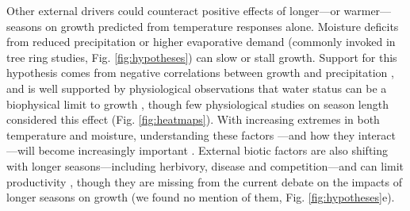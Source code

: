 \documentclass[11pt]{article}
\newcommand{\R}[1]{\label{#1}\linelabel{#1}}
\begin{document}
Other external drivers could counteract positive effects of longer---or warmer---seasons on growth predicted from temperature responses alone. Moisture deficits from reduced precipitation or higher evaporative demand (commonly invoked in tree ring studies, Fig. \ref{fig:hypotheses}) can slow or stall growth. Support for this hypothesis comes from negative correlations between growth and precipitation \citep[or other metrics related to plant access to water in tree ring studies,][]{kolavr2016response,etzold2022number}, and is well supported by physiological observations  that water status can be a biophysical limit to growth \citep[i.e., cells cannot expand without sufficient turgor,][]{peters2021turgor,cosgrove2023structure}, though few physiological studies on season length considered this effect (Fig. \ref{fig:heatmaps}). \R{bigKextremeS}With increasing extremes in both temperature and moisture, understanding these factors \citep{schuldt2020first}---and how they interact---will become increasingly important \citep{charrier2021interaction}.\R{bigKextremeE} External biotic factors are also shifting with longer seasons---including herbivory, disease and competition\citep{mitton2012mountain,lange2006thresholds,cleland2024effects}---and can limit productivity \citep{sturrock2011climate,la2008forest,senf2017remote}, though they are missing from the current debate on the impacts of longer seasons on growth (we found no mention of them, Fig. \ref{fig:hypotheses}e). 
\end{document}
